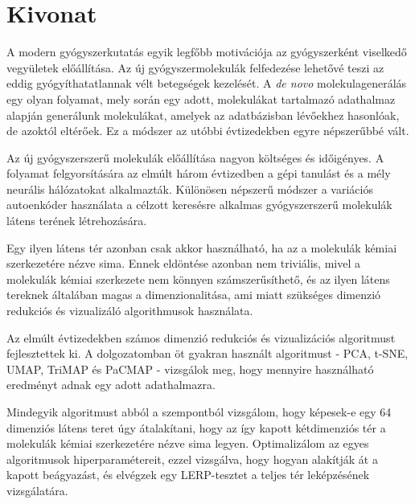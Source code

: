 \setcounter{page}{1}

\selecthungarian

\chapter*{Kivonat}

A modern gyógyszerkutatás egyik legfőbb motivációja az gyógyszerként viselkedő vegyületek előállítása. Az új gyógyszermolekulák felfedezése lehetővé teszi az eddig gyógyíthatatlannak vélt betegségek kezelését. A \textit{de novo} molekulagenerálás egy olyan folyamat, mely során egy adott, molekulákat tartalmazó adathalmaz alapján generálunk molekulákat, amelyek az adatbázisban lévőekhez hasonlóak, de azoktól eltérőek. Ez a módszer az utóbbi évtizedekben egyre népszerűbbé vált.

Az új gyógyszerszerű molekulák előállítása nagyon költséges és időigényes. A folyamat felgyorsítására az elmúlt három évtizedben a gépi tanulást és a mély neurális hálózatokat alkalmazták. Különösen népszerű módszer a variációs autoenkóder használata a célzott keresésre alkalmas gyógyszerszerű molekulák látens terének létrehozására.

Egy ilyen látens tér azonban csak akkor használható, ha az a molekulák kémiai szerkezetére nézve sima. Ennek eldöntése azonban nem triviális, mivel a molekulák kémiai szerkezete nem könnyen számszerűsíthető, és az ilyen látens tereknek általában magas a dimenzionalitása, ami miatt szükséges dimenzió redukciós és vizualizáló algorithmusok használata.

Az elmúlt évtizedekben számos dimenzió redukciós és vizualizációs algoritmust fejlesztettek ki. A dolgozatomban öt gyakran használt algoritmust - PCA, t-SNE, UMAP, TriMAP és PaCMAP - vizsgálok meg, hogy mennyire használható eredményt adnak egy adott adathalmazra.

Mindegyik algoritmust abból a szempontból vizsgálom, hogy képesek-e egy 64 dimenziós látens teret úgy átalakítani, hogy az így kapott kétdimenziós tér a molekulák kémiai szerkezetére nézve sima legyen. Optimalizálom az egyes algoritmusok hiperparamétereit, ezzel vizsgálva, hogy hogyan alakítják át a kapott beágyazást, és elvégzek egy LERP-tesztet a teljes tér leképzésének vizsgálatára.



